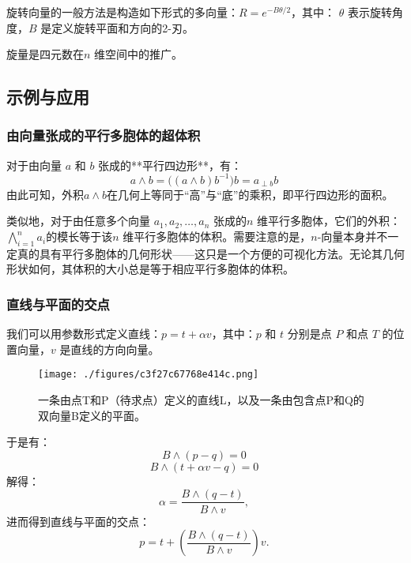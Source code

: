 旋转向量的一般方法是构造如下形式的多向量：$R = e^{-B\theta / 2}$，其中：
$\theta$ 表示旋转角度，$B$ 是定义旋转平面和方向的2-刃。

旋量是四元数在$n$ 维空间中的推广。
\subsection{示例与应用}
\subsubsection{由向量张成的平行多胞体的超体积}
对于由向量 $a$ 和 $b$ 张成的**平行四边形**，有：
$$
a \wedge b = \bigl((a \wedge b)b^{-1}\bigr)b = a_{\perp b} b~
$$
由此可知，外积$a \wedge b$在几何上等同于“高”与“底”的乘积，即平行四边形的面积。

类似地，对于由任意多个向量 $a_1, a_2, \ldots, a_n$ 张成的$n$ 维平行多胞体，它们的外积：$\bigwedge_{i=1}^n a_i$的模长等于该$n$ 维平行多胞体的体积。需要注意的是，$n$-向量本身并不一定真的具有平行多胞体的几何形状——这只是一个方便的可视化方法。无论其几何形状如何，其体积的大小总是等于相应平行多胞体的体积。
\subsubsection{直线与平面的交点}
我们可以用参数形式定义直线：$p = t + \alpha v$，其中：$p$ 和 $t$ 分别是点 $P$ 和点 $T$ 的位置向量，$v$ 是直线的方向向量。
\begin{figure}[ht]
\centering
\texttt{[image: ./figures/c3f27c67768e414c.png]}
\caption{一条由点T和P（待求点）定义的直线L，以及一条由包含点P和Q的双向量B定义的平面。} \label{fig_jiheds_9}
\end{figure}
于是有：
$$
B \wedge (p - q) = 0~
$$
$$
B \wedge (t + \alpha v - q) = 0~
$$
解得：
$$
\alpha = \frac{B \wedge (q - t)}{B \wedge v},~
$$
进而得到直线与平面的交点：
$$
p = t + \left(\frac{B \wedge (q - t)}{B \wedge v}\right)v.~
$$
